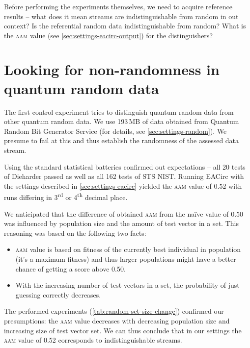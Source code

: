 \documentclass[12pt,oneside]{fithesis2}		%
\renewcommand{\_}{\leavevmode \kern0.0em\vbox{\hrule width0.4em}}
\newcommand{\squarebullet}{\textcolor{black}{\raisebox{0.15em}{\rule{4pt}{4pt}}}}
\newenvironment{myItemize}{
  \begin{itemize}[leftmargin=2em,rightmargin=1em,itemsep=\parskip ,parsep=0em,topsep=0em,partopsep=0em]
  \renewcommand{\labelitemi}{\squarebullet}
  \renewcommand{\labelitemii}{$\diamond$}
}{
  \end{itemize}
}
\begin{document}
Before performing the experiments themselves, we need to acquire reference results -- what does it mean
streams are indistinguishable from random in out context? Is the referential random data indistinguishable from random?
What is the \textsc{aam} value (see \autoref{sec:settings-eacirc-output}) for the distinguishers?

\section{Looking for non-randomness in quantum random data}
\label{sec:control-random-random}

The first control experiment tries to distinguish quantum random data from other quantum random data.
We use 193\,MB of data obtained from Quantum Random Bit Generator Service (for details, see \autoref{sec:settings-random}).
We presume to fail at this and thus establish the randomness of the assessed data stream.

Using the standard statistical batteries confirmed out expectations -- all 20 tests of Dieharder passed as well as
all 162 tests of STS NIST. Running EACirc with the settings described in \autoref{sec:settings-eacirc}
yielded the \textsc{aam} value of 0.52 with runs differing in 3\textsuperscript{rd}
or 4\textsuperscript{th} decimal place.

We anticipated that the difference of obtained \textsc{aam} from the naïve value of 0.50 was influenced by population size
and the amount of test vector in a set. This reasoning was based on the following two facts:
\begin{myItemize}
\item \textsc{aam} value is based on fitness of the currently best individual in population (it's a maximum fitness) and thus
larger populations might have a better chance of getting a score above 0.50.
\item With the increasing number of test vectors in a set, the probability of just guessing correctly decreases.
\end{myItemize}

\noindent
The performed experiments (\autoref{tab:random-set-size-change}) confirmed our presumptions: the \textsc{aam} value decreases
with decreasing population size and increasing size of test vector set. We can thus conclude that in our settings the \textsc{aam}
value of 0.52 corresponds to indistinguishable streams.
\end{document}
